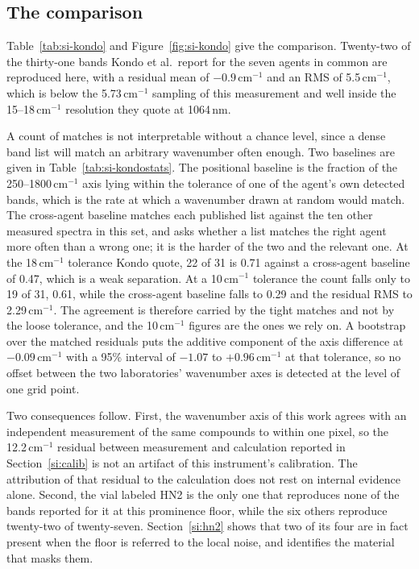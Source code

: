 \documentclass[11pt]{article}
\newcommand*\wn{\ensuremath{\text{cm}^{-1}}}
\begin{document}
\subsection{The comparison}

Table~\ref{tab:si-kondo} and Figure~\ref{fig:si-kondo} give the comparison. Twenty-two of
the thirty-one bands Kondo et al.\ report for the seven agents in common are reproduced
here, with a residual mean of $-0.9$\,\wn{} and an RMS of 5.5\,\wn{}, which is below the
5.73\,\wn{} sampling of this measurement and well inside the 15--18\,\wn{} resolution they
quote at 1064\,nm.

A count of matches is not interpretable without a chance level, since a dense band list
will match an arbitrary wavenumber often enough. Two baselines are given in
Table~\ref{tab:si-kondostats}. The positional baseline is the fraction of the
250--1800\,\wn{} axis lying within the tolerance of one of the agent's own detected bands,
which is the rate at which a wavenumber drawn at random would match. The cross-agent
baseline matches each published list against the ten other measured spectra in this set,
and asks whether a list matches the right agent more often than a wrong one; it is the
harder of the two and the relevant one. At the 18\,\wn{} tolerance Kondo quote, 22 of 31
is 0.71 against a cross-agent baseline of 0.47, which is a weak separation. At a 10\,\wn{}
tolerance the count falls only to 19 of 31, 0.61, while the cross-agent baseline falls to
0.29 and the residual RMS to 2.29\,\wn{}. The agreement is therefore carried by the tight
matches and not by the loose tolerance, and the 10\,\wn{} figures are the ones we rely on.
A bootstrap over the matched residuals puts the additive component of the axis difference
at $-0.09$\,\wn{} with a 95\% interval of $-1.07$ to $+0.96$\,\wn{} at that tolerance, so
no offset between the two laboratories' wavenumber axes is detected at the level of one
grid point.

Two consequences follow. First, the wavenumber axis of this work agrees with an
independent measurement of the same compounds to within one pixel, so the 12.2\,\wn{}
residual between measurement and calculation reported in Section~\ref{si:calib} is not an
artifact of this instrument's calibration. The attribution of that residual to the
calculation does not rest on internal evidence alone. Second, the vial labeled HN2 is the only one that
reproduces none of the bands reported for it at this prominence floor, while the six others
reproduce twenty-two of twenty-seven. Section~\ref{si:hn2} shows that two of its four are
in fact present when the floor is referred to the local noise, and identifies the material
that masks them.
\end{document}

